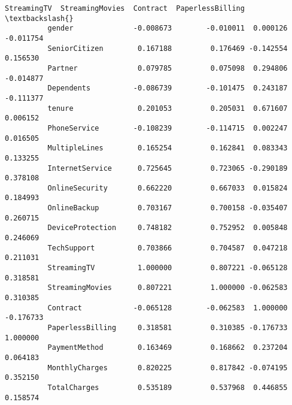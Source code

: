 \documentclass[11pt]{article}
\begin{document}
\begin{Verbatim}[commandchars=\\\{\}]
                            StreamingTV  StreamingMovies  Contract  PaperlessBilling  \textbackslash{}
          gender              -0.008673        -0.010011  0.000126         -0.011754   
          SeniorCitizen        0.167188         0.176469 -0.142554          0.156530   
          Partner              0.079785         0.075098  0.294806         -0.014877   
          Dependents          -0.086739        -0.101475  0.243187         -0.111377   
          tenure               0.201053         0.205031  0.671607          0.006152   
          PhoneService        -0.108239        -0.114715  0.002247          0.016505   
          MultipleLines        0.165254         0.162841  0.083343          0.133255   
          InternetService      0.725645         0.723065 -0.290189          0.378108   
          OnlineSecurity       0.662220         0.667033  0.015824          0.184993   
          OnlineBackup         0.703167         0.700158 -0.035407          0.260715   
          DeviceProtection     0.748182         0.752952  0.005848          0.246069   
          TechSupport          0.703866         0.704587  0.047218          0.211031   
          StreamingTV          1.000000         0.807221 -0.065128          0.318581   
          StreamingMovies      0.807221         1.000000 -0.062583          0.310385   
          Contract            -0.065128        -0.062583  1.000000         -0.176733   
          PaperlessBilling     0.318581         0.310385 -0.176733          1.000000   
          PaymentMethod        0.163469         0.168662  0.237204          0.064183   
          MonthlyCharges       0.820225         0.817842 -0.074195          0.352150   
          TotalCharges         0.535189         0.537968  0.446855          0.158574   
          

\end{Verbatim}
\end{document}
